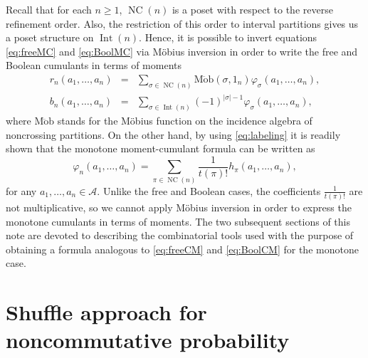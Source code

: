 \documentclass[11pt]{article}
\numberwithin{equation}{section}
\numberwithin{equation}{section}
\newcommand{\A}{\mathcal{A}}
\newcommand{\NC}{\operatorname{NC}}
\newcommand{\Int}{\operatorname{Int}}
\begin{document}
Recall that for each $n\geq1$, $\NC(n)$ is a poset with respect to the reverse refinement order. Also, the restriction of this order to interval partitions gives us a poset structure on $\Int(n)$. Hence, it is possible to invert equations \eqref{eq:freeMC} and \eqref{eq:BoolMC} via M\"obius inversion in order to write the free and Boolean cumulants in terms of moments
\begin{eqnarray}
	\label{eq:freeCM}
	r_n(a_1,\dots,a_n)
	&=& \sum_{\sigma \in \NC(n)} \operatorname{M\ddot{o}b}(\sigma,1_n)\varphi_\sigma(a_1,\dots,a_n),
	\\ \label{eq:BoolCM}
	b_n(a_1,\dots,a_n)
	&=& \sum_{\sigma \in \Int(n)}(-1)^{|\sigma|-1}\varphi_\sigma(a_1,\dots,a_n),
\end{eqnarray}
where $\mathrm{M\ddot{o}b}$ stands for the M\"obius function on the incidence algebra of noncrossing partitions.
On the other hand, by using \eqref{eq:labeling} it is readily shown that the monotone moment-cumulant formula can be written as
\begin{equation}
\label{eq:monMC2}
	\varphi_n(a_1,\dots,a_n) = \sum_{\pi\in \NC(n)} \frac{1}{t(\pi)!} h_\pi(a_1,\dots,a_n),
\end{equation}
for any $a_1,\dots,a_n\in \A$. Unlike the free and Boolean cases, the coefficients $\frac{1}{t(\pi)!}$ are not multiplicative, so we cannot apply M\"obius inversion in order to express the monotone cumulants in terms of moments. The two subsequent sections of this note are devoted to describing the combinatorial tools used with the purpose of obtaining a formula analogous to \eqref{eq:freeCM} and \eqref{eq:BoolCM} for the monotone case.

\fi

\section{Shuffle approach for noncommutative probability}
\label{sec:shuffle}
\end{document}
